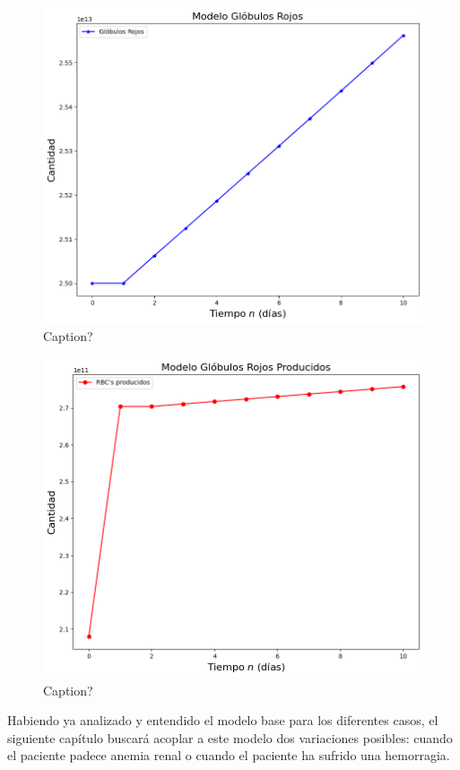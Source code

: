 \begin{figure}[h]
    \centering
    \includegraphics[scale=0.57]{figures/BaseG13RBC.png}
    \caption{Caption?}
    \label{sec:modelo:fig:G13RBC}
\end{figure}

\begin{figure}[h]
    \centering
    \includegraphics[scale=0.57]{figures/BaseG13SC.png}
    \caption{Caption?}
    \label{sec:modelo:fig:G13SC}
\end{figure}

Habiendo ya analizado y entendido el modelo base para los diferentes casos, el siguiente capítulo buscará acoplar a este modelo dos variaciones posibles: cuando el paciente padece anemia renal o cuando el paciente ha sufrido una hemorragia.